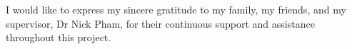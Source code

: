 I would like to express my sincere gratitude to my family, my friends, and my supervisor, Dr Nick Pham, for their continuous support and assistance throughout this project.